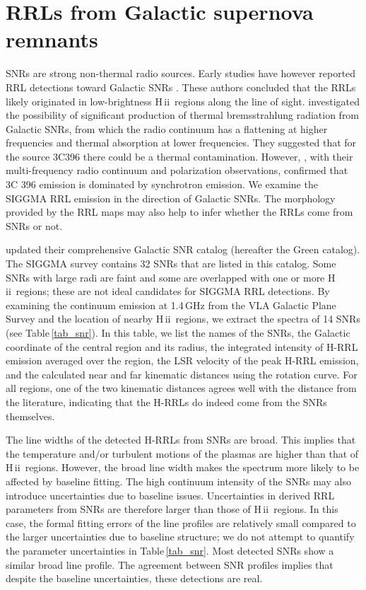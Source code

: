 \documentclass[manuscript]{aastex61}
\newcommand{\hii}{{\rm H\,}{{\sc ii}}}
\begin{document}
\section{RRLs from Galactic supernova remnants} \label{sec_snr}

SNRs are strong non-thermal radio sources.
Early studies have however reported RRL detections toward Galactic SNRs \citep{Downes1974,Pankonin1976}.
These authors concluded that the RRLs likely originated in low-brightness \hii\ regions along the line of sight.
\cite{Onic2012} investigated the possibility of significant production of thermal bremsstrahlung radiation from Galactic SNRs, from which the radio continuum has a flattening at higher frequencies and thermal absorption at lower frequencies. They suggested that for the source 3C396 there could be a thermal contamination.
However, \citep{Cruciani2016}, with their multi-frequency radio continuum and polarization observations, confirmed that 3C 396 emission is dominated by synchrotron emission.
We examine the SIGGMA RRL emission in the direction of Galactic SNRs.
The morphology provided by the RRL maps may also help to infer whether the RRLs come from SNRs or not.

\cite{Green2014} updated their comprehensive Galactic SNR catalog (hereafter the Green catalog).
The SIGGMA survey contains 32 SNRs that are listed in this catalog.
Some SNRs with large radi are faint and some are overlapped with one or more \hii\ regions; these are not ideal candidates for SIGGMA RRL detections.
By examining the continuum emission at 1.4\,GHz from the VLA Galactic Plane Survey \citep[VGPS,][]{Stil2006} and the location of nearby \hii\ regions, we extract the spectra of 14 SNRs (see Table\,\ref{tab_snr}).
In this table, we list the names of the SNRs, the Galactic coordinate of the central region and its radius,
 the integrated intensity of H-RRL emission averaged over the region,
 the LSR velocity of the peak H-RRL emission, and the calculated near and far kinematic distances using the \citet{Reid2014} rotation curve.  For all regions, one of the two kinematic distances agrees well with the distance from the literature, indicating that the H-RRLs do indeed come from the SNRs themselves.

The line widths of the detected H-RRLs from SNRs are broad. 
This implies that the temperature and/or turbulent motions of the plasmas are higher than that of \hii\ regions.
However, the broad line width makes the spectrum more likely to be affected by baseline fitting.
The high continuum intensity of the SNRs may also introduce uncertainties due to baseline issues. 
Uncertainties in derived RRL parameters from SNRs are therefore larger than those of \hii\ regions.
In this case, the formal fitting errors of the line profiles are relatively small compared to the larger uncertainties due to baseline structure; we do not attempt to quantify the parameter uncertainties in Table\,\ref{tab_snr}.
Most detected SNRs show a similar broad line profile.
The agreement between SNR profiles implies that despite the baseline uncertainties, these detections are real.
\end{document}
